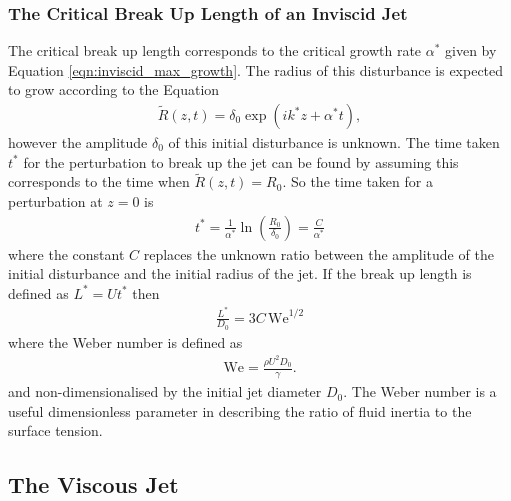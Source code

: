 \documentclass[11pt]{article}
\begin{document}
\subsubsection{The Critical Break Up Length of an Inviscid Jet} \label{sec:breakup_inviscid}
The critical break up length corresponds to the critical growth rate $\alpha^*$ given by Equation \ref{eqn:inviscid_max_growth}. The radius of this disturbance is expected to grow according to the Equation
\begin{align}
\tilde{R}(z,t) = \delta_0 \exp(ik^*z + \alpha^* t),
\end{align}
however the amplitude $\delta_0$ of this initial disturbance is unknown. The time taken $t^*$ for the perturbation to break up the jet can be found by assuming this corresponds to the time when $\tilde{R}(z,t) = R_0$. So the time taken for a perturbation at $z =0$ is
\begin{align*}
t^* = \frac{1}{\alpha^*} \ln \left( \frac{R_0}{\delta_0} \right) = \frac{C}{\alpha^*}
\end{align*}
where the constant $C$ replaces the unknown ratio between the amplitude of the initial disturbance and the initial radius of the jet. If the break up length is defined as $L^* = Ut^*$ then
\begin{align}
\frac{L^*}{D_0} = 3 C \, \mathrm{We}^{1/2}
\label{eqn:breakup_inviscid}
\end{align}
where the Weber number is defined as
\begin{align}
\mathrm{We} = \frac{\rho U^2 D_0}{\gamma}.
\end{align}
and non-dimensionalised by the initial jet diameter $D_0$. The Weber number is a useful dimensionless parameter in describing the ratio of fluid inertia to the surface tension. 

\subsection{The Viscous Jet}
\end{document}
